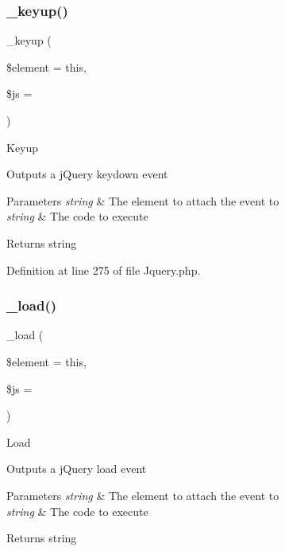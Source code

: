 \subsubsection{\texorpdfstring{\_keyup()}{\_keyup()}}
{\footnotesize\ttfamily \+\_\+keyup (\begin{DoxyParamCaption}\item[{}]{\$element = {\ttfamily \textquotesingle{}this\textquotesingle{}},  }\item[{}]{\$js = {\ttfamily \textquotesingle{}\textquotesingle{}} }\end{DoxyParamCaption})\hspace{0.3cm}{\ttfamily [protected]}}

Keyup

Outputs a j\+Query keydown event


\begin{DoxyParams}{Parameters}
{\em string} & The element to attach the event to \\
\hline
{\em string} & The code to execute \\
\hline
\end{DoxyParams}
\begin{DoxyReturn}{Returns}
string 
\end{DoxyReturn}


Definition at line 275 of file Jquery.\+php.

\mbox{\label{class_c_i___jquery_a24c1ddb2247d180ca74532e991afd4f6}} 
\subsubsection{\texorpdfstring{\_load()}{\_load()}}
{\footnotesize\ttfamily \+\_\+load (\begin{DoxyParamCaption}\item[{}]{\$element = {\ttfamily \textquotesingle{}this\textquotesingle{}},  }\item[{}]{\$js = {\ttfamily \textquotesingle{}\textquotesingle{}} }\end{DoxyParamCaption})\hspace{0.3cm}{\ttfamily [protected]}}

Load

Outputs a j\+Query load event


\begin{DoxyParams}{Parameters}
{\em string} & The element to attach the event to \\
\hline
{\em string} & The code to execute \\
\hline
\end{DoxyParams}
\begin{DoxyReturn}{Returns}
string 
\end{DoxyReturn}



